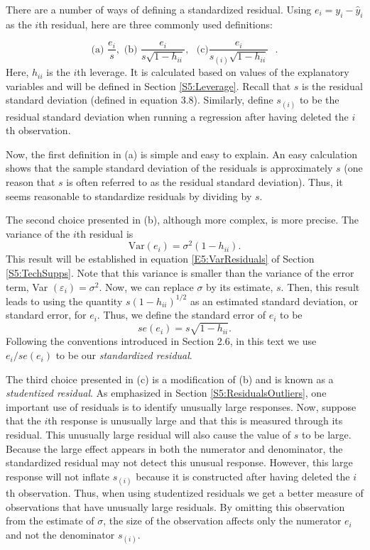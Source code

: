 There are a number of ways of defining a standardized residual.
Using $e_i = y_i-\hat{y}_i$ as the $i$th residual, here are three
commonly used definitions:

\begin{equation} \label{E5:StdResid}
\text{(a) }\frac{e_i}{s},\text{ \ \ \ (b) }\frac{e_i}{s\sqrt{
1-h_{ii}}}, \text { \  \   \   }\text{(c)
}\frac{e_i}{s_{(i)}\sqrt{1-h_{ii}}}\text{\ }.
\end{equation}
 \noindent Here, $h_{ii}$ is the $i$th leverage. It
is calculated based on values of the explanatory variables and will
be defined in Section \ref{S5:Leverage}. Recall that $ s $ is the
residual standard deviation (defined in equation 3.8). Similarly,
define $s_{(i)}$ to be the residual standard deviation when running
a regression after having deleted the $i$th observation.

Now, the first definition in (a) is simple and easy to explain. An
easy calculation shows that the sample standard deviation of the
residuals is approximately $s$ (one reason that $s$ is often
referred to as the residual standard deviation). Thus, it seems
reasonable to standardize residuals by dividing by $s$.

The second choice presented in (b), although more complex, is more
precise. The variance of the $i$th residual is
\begin{equation*}
\mathrm{Var}(e_i)=\sigma ^2(1-h_{ii}).
\end{equation*}
This result will be established in equation \ref{E5:VarResiduals} of
Section \ref{S5:TechSupps}. Note that this variance is smaller than
the variance of the error term, Var $(\varepsilon_i)=\sigma ^2$.
Now, we can replace $\sigma $ by its estimate, $s$. Then, this
result leads to using the quantity $s(1-h_{ii})^{1/2}$ as an
estimated standard deviation, or standard error, for $e_i$. Thus, we
define the standard error of $e_i$ to be
\begin{equation*}
se(e_i)=s \sqrt{1-h_{ii}}.
\end{equation*}
Following the conventions introduced in Section 2.6, in this text we
use $e_i/se(e_i)$ to be our \textit{standardized residual}.

The third choice presented in (c) is a modification of (b) and is
known as a \textit{studentized residual}. As emphasized in Section
\ref{S5:ResidualsOutliers}, one important use of residuals is to
identify unusually large responses. Now, suppose that the $i$th
response is unusually large and that this is measured through its
residual. This unusually large residual will also cause the value of
$s$ to be large. Because the large effect appears in both the
numerator and denominator, the standardized residual may not detect
this unusual response. However, this large response will not inflate
$s_{(i)}$ because it is constructed after having deleted the $i$th
observation. Thus, when using studentized residuals we get a better
measure of observations that have unusually large residuals. By
omitting this observation from the estimate of $\sigma $, the size
of the observation affects only the numerator $e_i$ and not the
denominator $s_{(i)}$.

